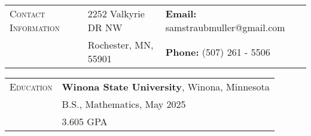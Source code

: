 \documentclass{article}
\begin{document}
\begin{tabular}{l l l}
\textsc{Contact Information} & 2252 Valkyrie DR NW & \textbf{Email:} samstraubmuller@gmail.com \\
				    & Rochester, MN, 55901 & \textbf{Phone:} (507) 261 - 5506 \\
\end{tabular}
\vspace{5mm}


\begin{tabular}{l l}
\textsc{Education} & \textbf{Winona State University}, Winona, Minnesota \\
 				  & 	\hspace{2.5mm} B.S., Mathematics, May 2025 \\
 				  & \hspace{2.5mm} 3.605 GPA \\
\end{tabular}\\

\vspace{2.5mm}
\end{document}
